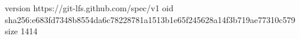 version https://git-lfs.github.com/spec/v1
oid sha256:e683fd7348b8554da6c78228781a1513b1e65f245628a14f3b719ae77310c579
size 1414
